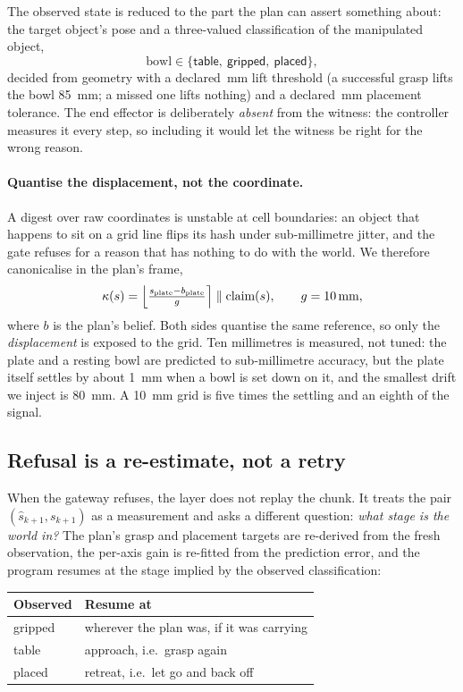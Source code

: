 \documentclass[conference]{IEEEtran}
\theoremstyle{definition}
\begin{document}
The observed state is reduced to the part the plan can assert something about:
the target object's pose and a three-valued classification of the manipulated
object,
\[
\text{bowl} \in \{\textsf{table},\ \textsf{gripped},\ \textsf{placed}\},
\]
decided from geometry with a declared \LiftEpsMm\,mm lift threshold (a successful
grasp lifts the bowl \SI{85}{mm}; a missed one lifts nothing) and a declared
\PlaceToleranceMm\,mm placement tolerance. The end effector is deliberately \emph{absent} from
the witness: the controller measures it every step, so including it would let
the witness be right for the wrong reason.

\paragraph{Quantise the displacement, not the coordinate.}
A digest over raw coordinates is unstable at cell boundaries: an object that
happens to sit on a grid line flips its hash under sub-millimetre jitter, and
the gate refuses for a reason that has nothing to do with the world. We
therefore canonicalise in the plan's frame,
\begin{equation}
\kappa(s) = \Bigl\lfloor \tfrac{s_{\text{plate}} - b_{\text{plate}}}{g}
\Bigr\rceil \;\Vert\; \text{claim}(s),
\qquad g = 10\,\text{mm},
\end{equation}
where $b$ is the plan's belief. Both sides quantise the same reference, so only
the \emph{displacement} is exposed to the grid. Ten millimetres is measured, not
tuned: the plate and a resting bowl are predicted to sub-millimetre accuracy,
but the plate itself settles by about \SI{1}{mm} when a bowl is set down on it,
and the smallest drift we inject is \SI{80}{mm}. A \SI{10}{mm} grid is five
times the settling and an eighth of the signal.

\subsection{Refusal is a re-estimate, not a retry}

When the gateway refuses, the layer does not replay the chunk. It treats the
pair $(\hat{s}_{k+1}, s_{k+1})$ as a measurement and asks a different question:
\emph{what stage is the world in?} The plan's grasp and placement targets are
re-derived from the fresh observation, the per-axis gain is re-fitted from the
prediction error, and the program resumes at the stage implied by the observed
classification:

\begin{center}
\small
\begin{tabular}{ll}
\toprule
Observed & Resume at \\
\midrule
\textsf{gripped} & wherever the plan was, if it was carrying \\
\textsf{table} & \textsf{approach}, i.e.\ grasp again \\
\textsf{placed} & \textsf{retreat}, i.e.\ let go and back off \\
\bottomrule
\end{tabular}
\end{center}
\end{document}
